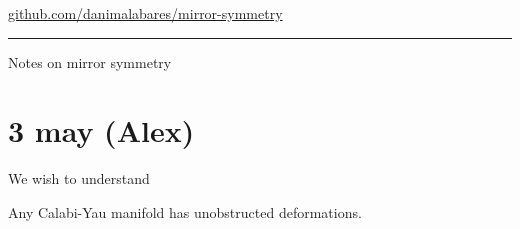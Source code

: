 



\begin{minipage}{\textwidth}
	\begin{minipage}{1\textwidth}
		 \hfill 
		
		{\small \hfill\href{https://github.com/danimalabares/mirror-symmetry}{github.com/danimalabares/mirror-symmetry}}
	\end{minipage}
\end{minipage}\vspace{.2cm}\hrule

\vspace{.5em}
{\LARGE Notes on mirror symmetry}
\tableofcontents
\section{3 may (Alex)}

We wish to understand
\begin{thm}
	Any Calabi-Yau manifold has unobstructed deformations.
\end{thm}

